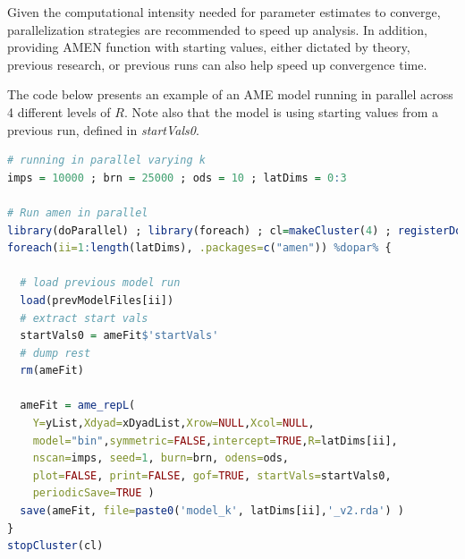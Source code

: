 Given the computational intensity needed for parameter estimates to converge, parallelization strategies are recommended to speed up analysis. In addition, providing AMEN function with starting values, either dictated by theory, previous research, or previous runs can also help speed up convergence time. 

The code below presents an example of an AME model running in parallel across 4 different levels of $R$. Note also that the model is using starting values from a previous run, defined in \textit{startVals0}. 

\begin{lstlisting}[language=R]
# running in parallel varying k
imps = 10000 ; brn = 25000 ; ods = 10 ; latDims = 0:3

# Run amen in parallel
library(doParallel) ; library(foreach) ; cl=makeCluster(4) ; registerDoParallel(cl)
foreach(ii=1:length(latDims), .packages=c("amen")) %dopar% {
  
  # load previous model run
  load(prevModelFiles[ii])
  # extract start vals
  startVals0 = ameFit$'startVals'
  # dump rest
  rm(ameFit)
  
  ameFit = ame_repL(
    Y=yList,Xdyad=xDyadList,Xrow=NULL,Xcol=NULL, 
    model="bin",symmetric=FALSE,intercept=TRUE,R=latDims[ii], 
    nscan=imps, seed=1, burn=brn, odens=ods, 
    plot=FALSE, print=FALSE, gof=TRUE, startVals=startVals0,
    periodicSave=TRUE )     
  save(ameFit, file=paste0('model_k', latDims[ii],'_v2.rda') )
}
stopCluster(cl)
\end{lstlisting}